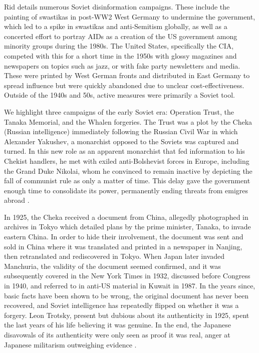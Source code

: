 \documentclass[doublespacing]{utdthesis}
\let\cite=\citep
\begin{document}
Rid \citeyear{rid2020} details numerous Soviet disinformation campaigns.
These include the painting of swastikas in post-WW2 West Germany to undermine the government, which led to a spike in swastikas and anti-Semitism globally, as well as a concerted effort to portray AIDs as a creation of the US government among minority groups during the 1980s.
The United States, specifically the CIA, competed with this for a short time in the 1950s with glossy magazines and newspapers on topics such as jazz, or with fake party newsletters and media.
These were printed by West German fronts and distributed in East Germany to spread influence but were quickly abandoned due to unclear cost-effectiveness.
Outside of the 1940s and 50s, active measures were primarily a Soviet tool.

We highlight three campaigns of the early Soviet era: Operation Trust, the Tanaka Memorial, and the Whalen forgeries. 
The Trust was a plot by the Cheka (Russian intelligence) immediately following the Russian Civil War in which Alexander Yakushev, a monarchist opposed to the Soviets was captured and turned.
In this new role as an apparent monarchist that fed information to his Chekist handlers, he met with exiled anti-Bolshevist forces in Europe, including the Grand Duke Nikolai, whom he convinced to remain inactive by depicting the fall of communist rule as only a matter of time.
This delay gave the government enough time to consolidate its power, permanently ending threats from emigres abroad \cite[ch. 1]{rid2020}.

In 1925, the Cheka received a document from China, allegedly photographed in archives in Tokyo which detailed plans by the prime minister, Tanaka, to invade eastern China.
In order to hide their involvement, the document was sent and sold in China where it was translated and printed in a newspaper in Nanjing, then retranslated and rediscovered in Tokyo.
When Japan later invaded Manchuria, the validity of the document seemed confirmed, and it was subsequently covered in the New York Times in 1932, discussed before Congress in 1940, and referred to in anti-US material in Kuwait in 1987.
In the years since, basic facts have been shown to be wrong, the original document has never been recovered, and Soviet intelligence has repeatedly flipped on whether it was a forgery.
Leon Trotsky, present but dubious about its authenticity in 1925, spent the last years of his life believing it was genuine.
In the end, the Japanese disavowals of its authenticity were only seen as proof it was real, anger at Japanese militarism outweighing evidence \cite[ch. 2]{rid2020}.
\end{document}
